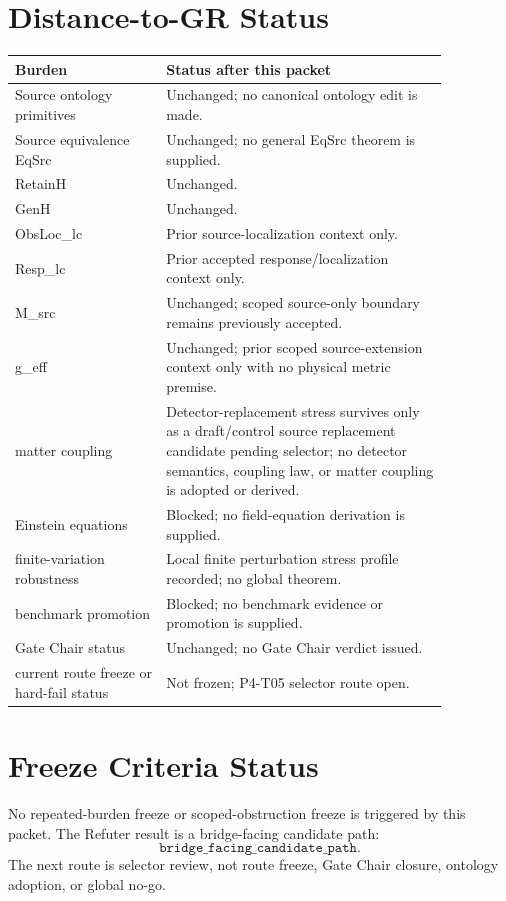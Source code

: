 \documentclass[11pt]{article}
\begin{document}
\section{Distance-to-GR Status}

\begin{longtable}{p{0.30\linewidth}p{0.56\linewidth}}
\toprule
Burden & Status after this packet \\
\midrule
Source ontology primitives & Unchanged; no canonical ontology edit is made. \\
Source equivalence EqSrc & Unchanged; no general EqSrc theorem is supplied. \\
RetainH & Unchanged. \\
GenH & Unchanged. \\
ObsLoc\_lc & Prior source-localization context only. \\
Resp\_lc & Prior accepted response/localization context only. \\
M\_src & Unchanged; scoped source-only boundary remains previously accepted. \\
g\_eff & Unchanged; prior scoped source-extension context only with no physical metric premise. \\
matter coupling & Detector-replacement stress survives only as a draft/control source replacement candidate pending selector; no detector semantics, coupling law, or matter coupling is adopted or derived. \\
Einstein equations & Blocked; no field-equation derivation is supplied. \\
finite-variation robustness & Local finite perturbation stress profile recorded; no global theorem. \\
benchmark promotion & Blocked; no benchmark evidence or promotion is supplied. \\
Gate Chair status & Unchanged; no Gate Chair verdict issued. \\
current route freeze or hard-fail status & Not frozen; P4-T05 selector route open. \\
\bottomrule
\end{longtable}

\section{Freeze Criteria Status}

No repeated-burden freeze or scoped-obstruction freeze is triggered by this
packet. The Refuter result is a bridge-facing candidate path:
\[
  \texttt{bridge\_facing\_candidate\_path}.
\]
The next route is selector review, not route freeze, Gate Chair closure,
ontology adoption, or global no-go.
\end{document}

